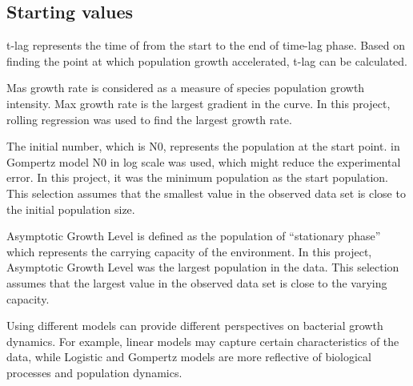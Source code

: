 \documentclass{article}
\begin{document}
\subsection{Starting values}
t-lag represents the time of from the start to the end of time-lag phase. Based on finding the point at which population growth accelerated, t-lag can be calculated. 

Mas growth rate is considered as a measure of species population growth intensity. Max growth rate is the largest gradient in the curve. In this project, rolling regression was used to find the largest growth rate.

The initial number, which is N0, represents the population at the start point. in Gompertz model N0 in log scale was used, which might reduce the experimental error\cite{peleg2011}. In this project, it was the minimum population as the start population. This selection assumes that the smallest value in the observed data set is close to the initial population size.

Asymptotic Growth Level is defined as the population of “stationary phase” which represents the carrying capacity of the environment\cite{peleg2011}. In this project, Asymptotic Growth Level was the largest population in the data. This selection assumes that the largest value in the observed data set is close to the varying capacity.

Using different models can provide different perspectives on bacterial growth dynamics. For example, linear models may capture certain characteristics of the data, while Logistic and Gompertz models are more reflective of biological processes and population dynamics.
\end{document}
